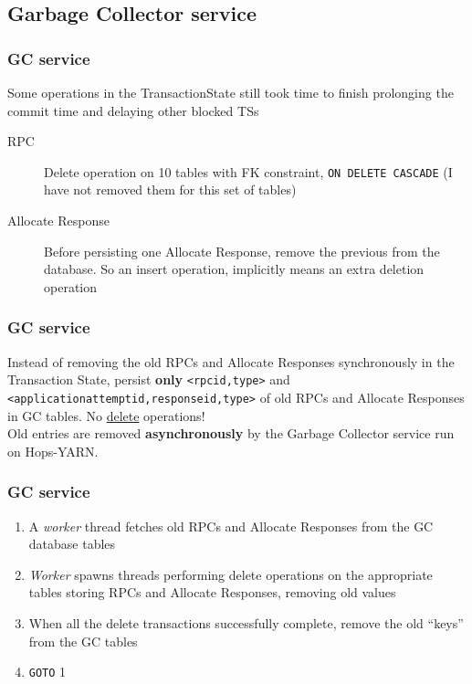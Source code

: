 \documentclass{beamer}
\begin{document}
\subsection{Garbage Collector service}
\begin{frame}
\frametitle{GC service}

Some operations in the TransactionState still took time to finish
prolonging the commit time and delaying other blocked TSs

\begin{description}
\item[RPC] Delete operation on 10 tables with FK constraint,
  \texttt{ON DELETE CASCADE} (I have not removed them for this set of tables)
\item[Allocate Response] Before persisting one Allocate Response,
  remove the previous from the database. So an insert operation,
  implicitly means an extra deletion operation
\end{description}
\end{frame}

\begin{frame}
\frametitle{GC service}

Instead of removing the old RPCs and Allocate Responses synchronously
in the Transaction State, persist \textbf{only} \texttt{<rpcid,type>}
and \texttt{<applicationattemptid,responseid,type>} of old RPCs and
Allocate Responses in GC tables. No \underline{delete} operations!\\[2em]

Old entries are removed \textbf{asynchronously} by the Garbage Collector
service run on Hops-YARN.
\end{frame}

\begin{frame}
\frametitle{GC service}

\begin{enumerate}
\item A \emph{worker} thread fetches old RPCs and Allocate Responses from the
  GC database tables

\item \emph{Worker} spawns threads performing delete operations on the
  appropriate tables storing RPCs and Allocate Responses, removing old
  values

\item When all the delete transactions successfully complete, remove
  the old ``keys'' from the GC tables

\item \texttt{GOTO} 1
\end{enumerate}
\end{frame}
\end{document}

